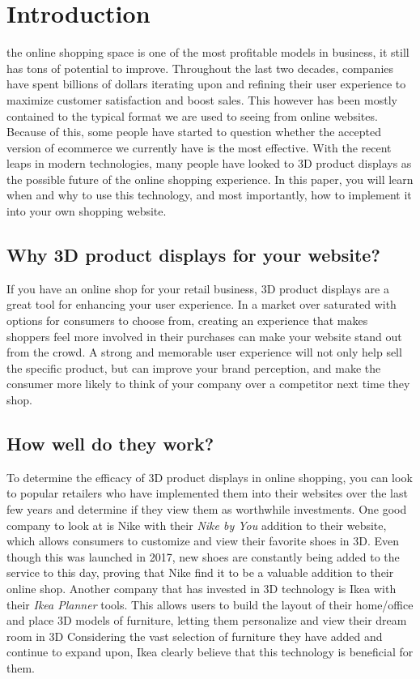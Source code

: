 \documentclass[10pt,final,journal,compsoc]{IEEEtran}
\begin{document}
\section{Introduction}
 the online shopping space is one of the most profitable models in business, it still has tons of potential to improve. Throughout the last two decades, companies have spent billions of dollars iterating upon and refining their user experience to maximize customer satisfaction and boost sales. This however has been mostly contained to the typical format we are used to seeing from online websites. Because of this, some people have started to question whether the accepted version of ecommerce we currently have is the most effective. With the recent leaps in modern technologies, many people have looked to 3D product displays as the possible future of the online shopping experience. In this paper, you will learn when and why to use this technology, and most importantly, how to implement it into your own shopping website.

    \subsection{Why 3D product displays for your website?}
    If you have an online shop for your retail business, 3D product displays are a great tool for enhancing your user experience. In a market over saturated with options for consumers to choose from, creating an experience that makes shoppers feel more involved in their purchases can make your website stand out from the crowd. A strong and memorable user experience will not only help sell the specific product, but can improve your brand perception, and make the consumer more likely to think of your company over a competitor next time they shop.
    
    \subsection{How well do they work?}
    To determine the efficacy of 3D product displays in online shopping, you can look to popular retailers who have implemented them into their websites over the last few years and determine if they view them as worthwhile investments. One good company to look at is Nike with their \textit{Nike by You} addition to their website, which allows consumers to customize and view their favorite shoes in 3D. Even though this was launched in 2017, new shoes are constantly being added to the service to this day, proving that Nike find it to be a valuable addition to their online shop. Another company that has invested in 3D technology is Ikea with their \textit{Ikea Planner} tools. This allows users to build the layout of their home/office and place 3D models of furniture, letting them personalize and view their dream room in 3D Considering the vast selection of furniture they have added and continue to expand upon, Ikea clearly believe that this technology is beneficial for them.
    
\end{document}
